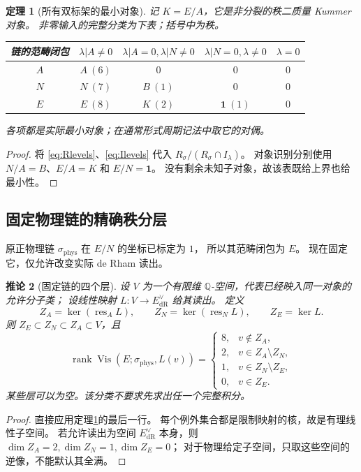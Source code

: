 \documentclass[11pt,a4paper]{ctexart}
\theoremstyle{cnplain}
\newtheorem{theorem}{定理}[section]
\newtheorem{corollary}[theorem]{推论}
\theoremstyle{definition}
\theoremstyle{remark}
\newcommand{\Q}{\mathbb Q}
\newcommand{\dR}{\mathrm{dR}}
\newcommand{\Vis}{\operatorname{Vis}}
\newcommand{\rank}{\operatorname{rank}}
\begin{document}
\begin{theorem}[所有双标架的最小对象]\label{thm:allframes}
记 $K=E/A$，它是非分裂的秩二质量 Kummer 对象。
非零输入的完整分类为下表；括号中为秩。
\begin{center}
\small
\begin{tabular}{c|cccc}
\toprule
链的范畴闭包&$\lambda|A\ne0$
 &$\lambda|A=0,\lambda|N\ne0$
 &$\lambda|N=0,\lambda\ne0$&$\lambda=0$\\
\midrule
$A$&$A\ (6)$&$0$&$0$&$0$\\
$N$&$N\ (7)$&$B\ (1)$&$0$&$0$\\
$E$&$E\ (8)$&$K\ (2)$&$\mathbf1\ (1)$&$0$\\
\bottomrule
\end{tabular}
\end{center}
各项都是实际最小对象；在通常形式周期记法中取它的对偶。
\end{theorem}
\begin{proof}
将 \eqref{eq:Rlevels}、\eqref{eq:Ilevels} 代入
$R_\sigma/(R_\sigma\cap I_\lambda)$。
对象识别分别使用 $N/A=B$、$E/A=K$ 和 $E/N=\mathbf1$。
没有剩余未知子对象，故该表既给上界也给最小性。
\end{proof}

\subsection{固定物理链的精确秩分层}
原正物理链 $\sigma_{\mathrm{phys}}$ 在 $E/N$ 的坐标已标定为 $1$，
所以其范畴闭包为 $E$。
现在固定它，仅允许改变实际 de Rham 读出。
\begin{corollary}[固定链的四个层]\label{cor:numerators}
设 $V$ 为一个有限维 $\Q$-空间，代表已经映入同一对象的允许分子类；
设线性映射 $L:V\to E_{\dR}^{\vee}$ 给其读出。
定义
\begin{equation}\label{eq:exceptional}
 Z_A=\ker(\operatorname{res}_A L),\qquad
 Z_N=\ker(\operatorname{res}_N L),\qquad Z_E=\ker L.
\end{equation}
则 $Z_E\subset Z_N\subset Z_A\subset V$，且
\begin{equation}\label{eq:rankstrata}
 \rank\Vis(E;\sigma_{\mathrm{phys}},L(v))=
 \begin{cases}
 8,&v\notin Z_A,\\
 2,&v\in Z_A\setminus Z_N,\\
 1,&v\in Z_N\setminus Z_E,\\
 0,&v\in Z_E.
 \end{cases}
\end{equation}
某些层可以为空。该分类不要求先求出任一个完整积分。
\end{corollary}
\begin{proof}
直接应用定理\ref{thm:allframes}的最后一行。
每个例外集合都是限制映射的核，故是有理线性子空间。
若允许读出为空间 $E_{\dR}^{\vee}$ 本身，则
$\dim Z_A=2,\dim Z_N=1,\dim Z_E=0$；
对于物理给定子空间，只取这些空间的逆像，不能默认其全满。
\end{proof}
\end{document}
